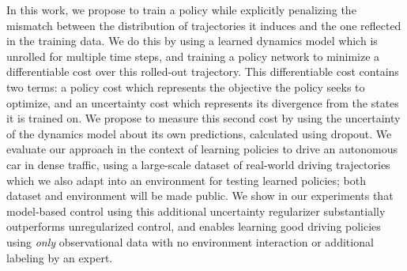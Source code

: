 \documentclass{article} %
\begin{document}
In this work, we propose to train a policy while explicitly penalizing the mismatch between the distribution of trajectories it induces and the one reflected in the training data.
We do this by using a learned dynamics model which is unrolled for multiple time steps, and training a policy network to minimize a differentiable cost over this rolled-out trajectory.
This differentiable cost contains two terms: a policy cost which represents the objective the policy seeks to optimize, and an uncertainty cost which represents its divergence from the states it is trained on.
We propose to measure this second cost by using the uncertainty of the dynamics model about its own predictions, calculated using dropout.
We evaluate our approach in the context of learning policies to drive an autonomous car in dense traffic, using a large-scale dataset of real-world driving trajectories which we also adapt into an environment for testing learned policies; both dataset and environment will be made public.
We show in our experiments that model-based control using this additional uncertainty regularizer substantially outperforms unregularized control, and enables learning good driving policies using \emph{only} observational data with no environment interaction or additional labeling by an expert.
\end{document}
